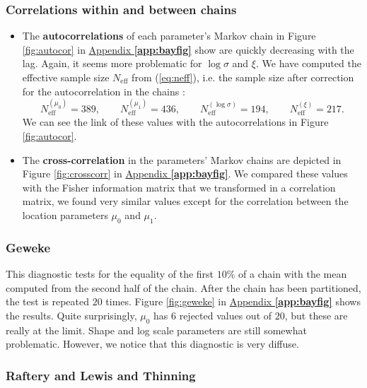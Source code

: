 \subsubsection*{Correlations within and between chains}


\begin{itemize}
	\item The \textbf{autocorrelations} of each parameter's Markov chain in Figure \ref{fig:autocor} in \hyperref[app:bayfig]{Appendix \textbf{\ref{app:bayfig}}} show are quickly decreasing with the lag. Again, it seems more problematic for $\log\sigma$ and $\xi$.	
	We have computed the effective sample size $N_{\text{eff}}$ from (\ref{eq:neff}), i.e. the sample size after correction for the autocorrelation in the chains :
	\begin{equation}
		N_{\text{eff}}^{(\mu_0)} = 389, \qquad 	N_{\text{eff}}^{(\mu_1)} = 436, \qquad 	N_{\text{eff}}^{(\log\sigma)} = 194, \qquad	N_{\text{eff}}^{(\xi)} = 217.
	\end{equation}
	We can see the link of these values with the autocorrelations in Figure \ref{fig:autocor}.
	
	\item The \textbf{cross-correlation} in the parameters' Markov chains are depicted in Figure \ref{fig:crosscorr} in \hyperref[app:bayfig]{Appendix \textbf{\ref{app:bayfig}}}. We compared these values with the Fisher information matrix that we transformed in a correlation matrix, we found very similar values except for the correlation between the location parameters $\mu_0$ and $\mu_1$.
\end{itemize}


\subsubsection*{Geweke}

This diagnostic tests for the equality of the first $10\%$ of a chain with the mean computed from the second half of the chain. After the chain has been partitioned, the test is repeated $20$ times.
Figure \ref{fig:geweke} in \hyperref[app:bayfig]{Appendix \textbf{\ref{app:bayfig}}} shows the results. Quite surprisingly, $\mu_0$ has $6$ rejected values out of $20$, but these are really at the limit. Shape and log scale parameters are still somewhat problematic. However, we notice that this diagnostic is very diffuse.


\subsubsection*{Raftery and Lewis and Thinning}

